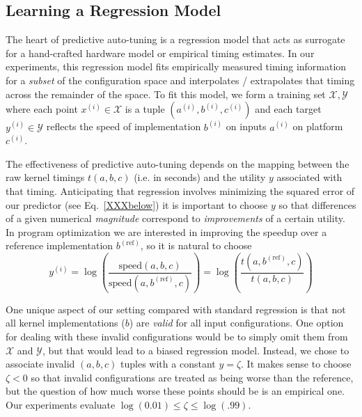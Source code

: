 \documentclass{sig-alternate}
\begin{document}
\subsection{Learning a Regression Model}

The heart of predictive auto-tuning is a regression model that acts as surrogate
for a hand-crafted hardware model or empirical timing estimates.
In our experiments, this regression model fits empirically measured timing information for a {\em subset} of the configuration space and interpolates / extrapolates that timing across the remainder of the space.
To fit this model, we
form a training set $\mathcal{X}, \mathcal{Y}$ where
each point $x^{(i)} \in \mathcal{X}$ is a tuple $(a^{(i)}, b^{(i)}, c^{(i)})$
and each target $y^{(i)} \in \mathcal{Y}$  reflects the speed of implementation $b^{(i)}$
on inputs $a^{(i)}$ on platform $c^{(i)}$.

The effectiveness of predictive auto-tuning depends on the mapping between the raw kernel timings $t(a, b, c)$ (i.e. in seconds) and the utility $y$ associated with that timing.
Anticipating that regression involves minimizing the squared error of our predictor (see Eq.~\ref{XXXbelow}) it is important to choose $y$ so that differences of a given numerical {\em magnitude} correspond to {\em improvements} of a certain utility.
In program optimization we are interested in improving the speedup over a reference implementation $b^{(\mathrm{ref})}$, so it is natural to choose
\begin{equation}
y^{(i)}
= \log\left(\frac{\mathrm{speed}(a, b, c)}{\mathrm{speed}(a, b^{(\mathrm{ref})}, c)} \right)
= \log\left(\frac{t(a, b^{(\mathrm{ref})}, c)}{t(a, b, c)} \right)
\end{equation}

One unique aspect of our setting compared with standard regression
is that not all kernel implementations ($b$) are {\em valid}
for all input configurations. One option for dealing with these invalid configurations
would be to simply omit them from $\mathcal{X}$ and $\mathcal{Y}$, but that would lead to a biased regression model.
Instead, we chose to associate invalid $(a, b, c)$ tuples with a constant $y = \zeta$.
It makes sense to choose $\zeta < 0$ so that invalid configurations are treated as being worse than the reference,
but the question of how much worse these points should be is an empirical one.
Our experiments evaluate $\log(0.01) \leq \zeta \leq \log(.99)$.

\end{document}

